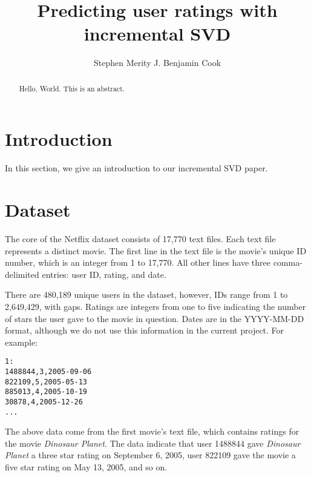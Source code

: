 \documentclass{article} %
\title{Predicting user ratings with incremental SVD}
\author{
Stephen Merity
\And
J. Benjamin Cook
}
\begin{document}
\maketitle

\begin{abstract}
Hello, World. This is an abstract.
\end{abstract}

\section{Introduction}
In this section, we give an introduction to our incremental SVD paper.

\section{Dataset}
The core of the Netflix dataset consists of 17,770 text files.
Each text file represents a distinct movie.
The first line in the text file is the movie's unique ID number, which is
an integer from 1 to 17,770.
All other lines have three comma-delimited entries: user ID, rating, and date.

There are 480,189 unique users in the dataset, however, IDs range from 1 to 2,649,429, with gaps. 
Ratings are integers from one to five indicating the number of stars 
the user gave to the movie in question.
Dates are in the YYYY-MM-DD format, although we do not use this information in the current project. 
For example:
\begin{verbatim}
1:
1488844,3,2005-09-06
822109,5,2005-05-13
885013,4,2005-10-19
30878,4,2005-12-26
...
\end{verbatim}
The above data come from the first movie's text file, which contains ratings for the movie \emph{Dinosaur Planet}. The data indicate that user 1488844 gave \emph{Dinosaur Planet} a three star rating on September 6, 2005, user 822109 gave the movie a five star rating on May 13, 2005, and so on.
\end{document}
